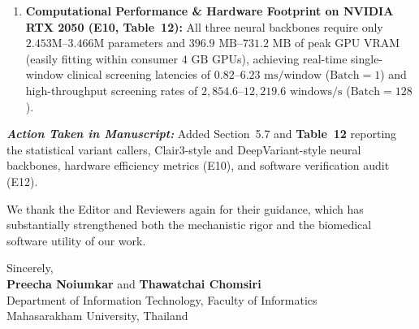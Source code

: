 \documentclass[11pt,a4paper]{article}
\newcommand{\manuscriptchange}{\vspace{0.3em}\noindent\textit{\textbf{Action Taken in Manuscript: }}}
\begin{document}
\begin{enumerate}
\begin{itemize}
        \item \textit{Collapse of Smooth RectLU in Clinical Variant-Calling Backbones and Recovery via Symmetric $\sigma$-AS-RectLU:} Crucially, deploying uncompensated Smooth RectLU ($L=0, W=2$) inside a \textbf{Clair3-Style PileupNet} (column-wise read-depth convolutions + sequence convolutions) causes complete 100\% stagnation across all seeds ($\text{MCC}(\tau^*) = 0.0000 \pm 0.0000, \text{F1} = 0.0000, \text{AUROC} = 0.5000$), while deploying it inside a \textbf{DeepVariant-Style Multi-Scale InceptionNet} ($1\times 1, 3\times 3, 5\times 5$ receptive fields) degrades performance to $\text{MCC}(\tau^*) = 0.4478 \pm 0.1629$ ($\text{F1} = 0.4886, \text{AUROC} = 0.8747$) with a high false-positive rate of $41.4\text{ FP per }1,000\text{ windows}$. Replacing Smooth RectLU with \textbf{Symmetric $\sigma$-AS-RectLU ($\kappa=0.8$)} completely eliminates collapse across all three backbones: it restores Clair3-Style PileupNet to $\text{MCC}(\tau^*) = \mathbf{0.9722 \pm 0.0076}$ ($\text{F1} = 0.9743, \text{AUROC} = 1.0000, \text{FP/1k} = 0.0$), elevates DeepVariant-Style InceptionNet to $\text{MCC}(\tau^*) = \mathbf{0.9815 \pm 0.0076}$ ($\text{F1} = 0.9830, \text{FP/1k} = 0.0$, outperforming ReLU at $0.9754 \pm 0.0044$), and achieves the highest overall accuracy in PathwayB-2DCNN ($\text{MCC}(\tau^*) = \mathbf{0.9877 \pm 0.0044}, \text{F1} = \mathbf{0.9887}, \text{FP/1k} = \mathbf{0.0}$).
    \end{itemize}
    \item \textbf{Computational Performance \& Hardware Footprint on NVIDIA RTX 2050 (E10, Table~12):} All three neural backbones require only $2.453\text{M}$--$3.466\text{M}$ parameters and $396.9\text{ MB}$--$731.2\text{ MB}$ of peak GPU VRAM (easily fitting within consumer $4\text{ GB}$ GPUs), achieving real-time single-window clinical screening latencies of $0.82$--$6.23\text{ ms/window}$ ($\text{Batch}=1$) and high-throughput screening rates of $2,854.6$--$12,219.6\text{ windows/s}$ ($\text{Batch}=128$).
\end{enumerate}

\manuscriptchange Added Section~5.7 and \textbf{Table~12} reporting the statistical variant callers, Clair3-style and DeepVariant-style neural backbones, hardware efficiency metrics (E10), and software verification audit (E12).

\vspace{1em}
\noindent We thank the Editor and Reviewers again for their guidance, which has substantially strengthened both the mechanistic rigor and the biomedical software utility of our work.

\vspace{0.8em}
\noindent Sincerely,\\[0.4em]
\textbf{Preecha Noiumkar} and \textbf{Thawatchai Chomsiri}\\
Department of Information Technology, Faculty of Informatics\\
Mahasarakham University, Thailand
\end{document}
